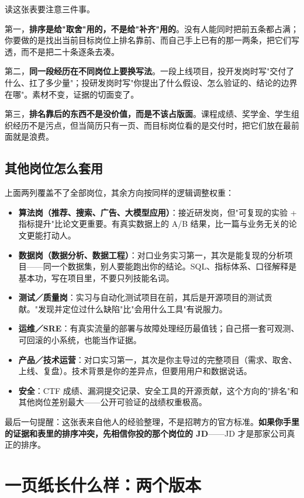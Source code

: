 \documentclass[UTF8,zihao=5,openany]{ctexbook}
\begin{document}
读这张表要注意三件事。

第一，\textbf{排序是给"取舍"用的，不是给"补齐"用的}。没有人能同时把前五条都占满；你要做的是找出当前目标岗位上排名靠前、而自己手上已有的那一两条，把它们写透，而不是把二十条逐条去凑。

第二，\textbf{同一段经历在不同岗位上要换写法}。一段上线项目，投开发岗时写"交付了什么、扛了多少量"；投研发岗时写"你提出了什么假设、怎么验证的、结论的边界在哪"。素材不变，证据的切面变了。

第三，\textbf{排名靠后的东西不是没价值，而是不该占版面}。课程成绩、奖学金、学生组织经历不是污点，但当简历只有一页、而目标岗位看的是交付时，把它们放在最前面就是浪费。

\subsection{其他岗位怎么套用}

上面两列覆盖不了全部岗位，其余方向按同样的逻辑调整权重：

\begin{itemize}
\item \textbf{算法岗（推荐、搜索、广告、大模型应用）}：接近研发岗，但"可复现的实验 + 指标提升"比论文更重要。有真实数据上的 A/B 结果，比一篇与业务无关的论文更能打动人。
\item \textbf{数据岗（数据分析、数据工程）}：对口业务实习第一，其次是能复现的分析项目——同一个数据集，别人要能跑出你的结论。SQL、指标体系、口径解释是基本功，写在项目里，不要只列技能名词。
\item \textbf{测试／质量岗}：实习与自动化测试项目在前，其后是开源项目的测试贡献。"发现并定位过什么缺陷"比"会用什么工具"有说服力。
\item \textbf{运维／SRE}：有真实流量的部署与故障处理经历最值钱；自己搭一套可观测、可回滚的小系统，也能当作证据。
\item \textbf{产品／技术运营}：对口实习第一，其次是你主导过的完整项目（需求、取舍、上线、复盘）。技术背景是你的差异点，但要用用户和数据说话。
\item \textbf{安全}：CTF 成绩、漏洞提交记录、安全工具的开源贡献，这个方向的"排名"和其他岗位差别最大——公开可验证的战绩权重极高。
\end{itemize}

最后一句提醒：这张表来自他人的经验整理，不是招聘方的官方标准。\textbf{如果你手里的证据和表里的排序冲突，先相信你投的那个岗位的 JD}——JD 才是那家公司真正的排序。
\section{一页纸长什么样：两个版本}
\end{document}
